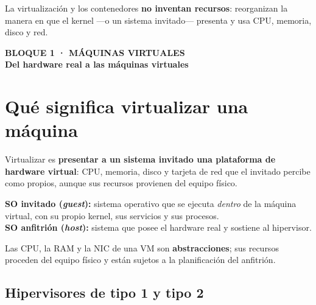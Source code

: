 \documentclass[11pt,a4paper]{article}
\newcommand{\bloque}[2]{%
  \vspace{1.2em}
  \begin{tcolorbox}[enhanced, colback=azulprof, colframe=azulprof, arc=3pt,
      left=12pt,right=12pt,top=9pt,bottom=9pt]
    {\color{white!75!azulmedio}\footnotesize\bfseries\MakeUppercase{#1}}\\[2pt]
    {\color{white}\large\bfseries #2}
  \end{tcolorbox}
  \vspace{0.2em}}
\begin{document}
\begin{clave}
La virtualización y los contenedores \textbf{no inventan recursos}: reorganizan la manera
en que el kernel —o un sistema invitado— presenta y usa CPU, memoria, disco y red.
\end{clave}

\bloque{Bloque 1 · Máquinas virtuales}{Del hardware real a las máquinas virtuales}

\section{Qué significa virtualizar una máquina}

Virtualizar es \textbf{presentar a un sistema invitado una plataforma de hardware virtual}:
CPU, memoria, disco y tarjeta de red que el invitado percibe como propios, aunque sus
recursos provienen del equipo físico.

\begin{center}
\end{center}

\begin{defbox}
\textbf{SO invitado (\emph{guest}):} sistema operativo que se ejecuta \emph{dentro} de la
máquina virtual, con su propio kernel, sus servicios y sus procesos.\\
\textbf{SO anfitrión (\emph{host}):} sistema que posee el hardware real y sostiene al hipervisor.
\end{defbox}

\begin{clave}
Las CPU, la RAM y la NIC de una VM son \textbf{abstracciones}; sus recursos proceden del
equipo físico y están sujetos a la planificación del anfitrión.
\end{clave}

\subsection{Hipervisores de tipo 1 y tipo 2}
\end{document}
